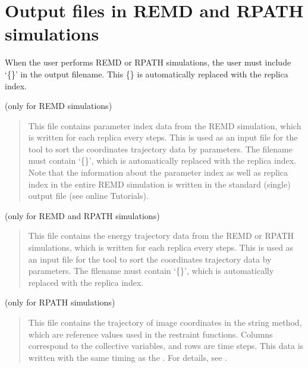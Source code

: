 \documentclass[a4paper,11pt,oneside,english]{sphinxmanual}
\begin{document}
\section{Output files in REMD and RPATH simulations}
\label{\detokenize{04_Output:output-files-in-remd-and-rpath-simulations}}
When the user performs REMD or RPATH simulations,
the user must include ‘\{\}’ in the output filename.
This \{\} is automatically replaced with the replica index.

 (only for REMD simulations)
\begin{quote}

This file contains parameter index data from the REMD simulation, which is
written for each replica every  steps.
This is used as an input file for the  tool
to sort the coordinates trajectory data by parameters.
The filename must contain ‘\{\}’, which is automatically replaced with the replica index.
Note that the information about the parameter index as well as replica index
in the entire REMD simulation is written in the standard (single) output file
(see online Tutorials).
\end{quote}

 (only for REMD and RPATH simulations)
\begin{quote}

This file contains the energy trajectory data from the REMD or RPATH simulations, which is
written for each replica every  steps.
This is used as an input file for the  tool
to sort the coordinates trajectory data by parameters.
The filename must contain ‘\{\}’, which is automatically replaced with the replica index.
\end{quote}

 (only for RPATH simulations)
\begin{quote}

This file contains the trajectory of image coordinates in the string method,
which are reference values used in the restraint functions.
Columns correspond to the collective variables, and rows are time steps.
This data is written with the same timing as the .
For details, see {\hyperref[\detokenize{15_RPath:rpath}]{}}.
\end{quote}
\end{document}
